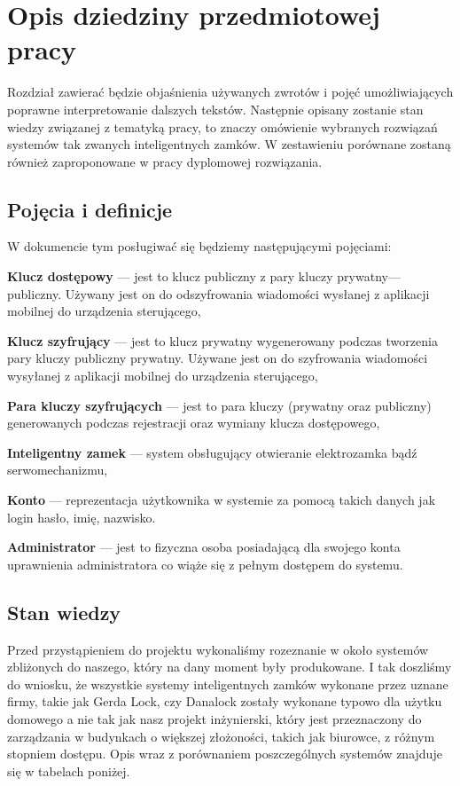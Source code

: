 % 
\newpage
\section{Opis dziedziny przedmiotowej pracy}\label{sec:dziedzina}
Rozdział zawierać będzie objaśnienia używanych zwrotów i pojęć umożliwiających poprawne interpretowanie dalszych tekstów. Następnie opisany zostanie stan wiedzy związanej z tematyką pracy, to znaczy omówienie wybranych rozwiązań systemów tak zwanych inteligentnych zamków. W zestawieniu porównane zostaną również zaproponowane w pracy dyplomowej rozwiązania.
\subsection{Pojęcia i definicje}
W dokumencie tym posługiwać się będziemy następującymi pojęciami:
	\begin{itemize*}
	\item \textbf{Klucz dostępowy} --- jest to klucz publiczny z pary kluczy prywatny---publiczny. Używany jest on do odszyfrowania wiadomości wysłanej z aplikacji mobilnej do urządzenia sterującego,
	\item \textbf{Klucz szyfrujący} 
	--- jest to klucz prywatny wygenerowany podczas tworzenia pary kluczy publiczny prywatny. Używane jest on do szyfrowania wiadomości wysyłanej z aplikacji mobilnej do urządzenia sterującego,
    \item \textbf{Para kluczy szyfrujących}
    --- jest to para kluczy (prywatny oraz publiczny) generowanych podczas rejestracji oraz wymiany klucza dostępowego,
	\item \textbf{Inteligentny zamek}
	--- system obsługujący otwieranie elektrozamka bądź serwomechanizmu,
    \item \textbf{Konto}
	--- reprezentacja użytkownika w systemie za pomocą takich danych jak login hasło, imię, nazwisko.
	\item \textbf{Administrator}
	--- jest to fizyczna osoba posiadającą dla swojego konta uprawnienia administratora co wiąże się z pełnym dostępem do systemu.					
\end{itemize*}

\newpage
\subsection{Stan wiedzy}
Przed przystąpieniem do projektu wykonaliśmy rozeznanie w około systemów zbliżonych do naszego, który na dany moment były produkowane. I tak doszliśmy do wniosku, że wszystkie systemy inteligentnych zamków wykonane przez uznane firmy, takie jak Gerda Lock, czy Danalock zostały wykonane typowo dla użytku domowego a nie tak jak nasz projekt inżynierski, który jest przeznaczony do zarządzania w budynkach o większej złożoności, takich jak biurowce, z różnym stopniem dostępu. Opis wraz z porównaniem poszczególnych systemów znajduje się w tabelach poniżej.

